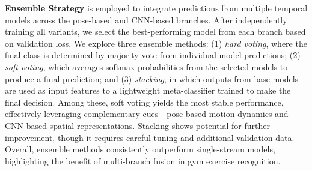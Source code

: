 \documentclass[journal,onecolumn, 11pt]{IEEEtran}
\begin{document}
\textbf{Ensemble Strategy} is employed to integrate predictions from multiple temporal models across the pose-based and CNN-based branches. After independently training all variants, we select the best-performing model from each branch based on validation loss. We explore three ensemble methods: (1) \textit{hard voting}, where the final class is determined by majority vote from individual model predictions; (2) \textit{soft voting}, which averages softmax probabilities from the selected models to produce a final prediction; and (3) \textit{stacking}, in which outputs from base models are used as input features to a lightweight meta-classifier trained to make the final decision. Among these, soft voting yields the most stable performance, effectively leveraging complementary cues - pose-based motion dynamics and CNN-based spatial representations. Stacking shows potential for further improvement, though it requires careful tuning and additional validation data. Overall, ensemble methods consistently outperform single-stream models, highlighting the benefit of multi-branch fusion in gym exercise recognition.\cite{wolpert1992stacking}








\end{document}
